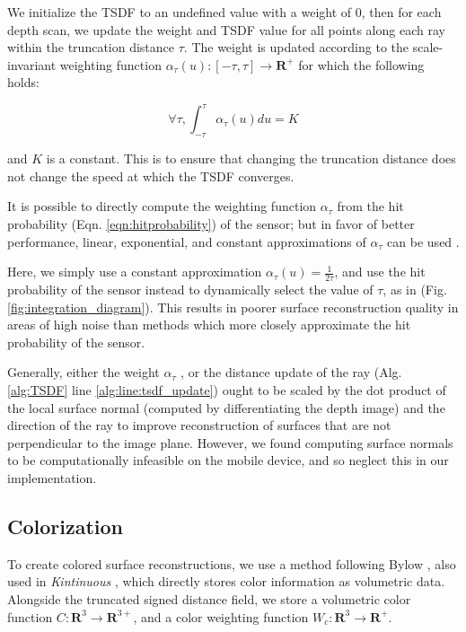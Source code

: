 \documentclass[10pt,twocolumn,letterpaper]{article}
\newcommand{\figref}[1]{Fig.\ref{#1}}
\begin{document}
We initialize the TSDF to an undefined value with a
weight of $0$, then for each depth scan, we update the weight and TSDF value
for all points along each ray within the truncation distance $\tau$. The weight
is updated according to the scale-invariant weighting function $\alpha_{\tau}(u) :
[-\tau,\tau]\to \mathbf{R^{+}} $ for which the following holds:

\begin{equation}
	\forall \tau, \int_{-\tau}^{\tau} \alpha_{\tau}(u) du = K 
\end{equation}
 
 \noindent and $K$ is a constant. This is to ensure that changing the truncation
 distance does not change the speed at which the TSDF converges.  

 It is possible \cite{Nguyen2012} to directly compute the weighting function
 $\alpha_{\tau}$ from the hit probability (Eqn. \ref{eqn:hitprobability}) of the
 sensor; but in favor of better performance, linear, exponential, and constant
 approximations of $\alpha_{\tau}$ can be used \cite{Curless1996, Newcombe,
 Whelan2013, Bylow2013}.

Here, we simply use a constant approximation $\alpha_{\tau}(u) = \frac{1}{2
\tau}$, and use the hit probability of the sensor instead to  dynamically select
the value of $\tau$, as in \cite{Nguyen2012} (\figref{fig:integration_diagram}).
This results in poorer surface reconstruction quality in areas of high noise
than methods which more closely approximate the hit probability of the sensor.

Generally, either the weight $\alpha_{\tau}$ \cite{Newcombe, Whelan2013}, or
the distance update of the ray (Alg. \ref{alg:TSDF} line
\ref{alg:line:tsdf_update}) \cite{Curless1996, Bylow2013} ought to be scaled by
the dot product of the local surface normal (computed by differentiating the
depth image) and the direction of the ray to improve reconstruction of surfaces
that are not perpendicular to the image plane. However, we found computing
surface normals to be computationally infeasible on the mobile device, and so
neglect this in our implementation.

\subsection{Colorization}
\label{section:color}
To create colored surface reconstructions, we use a method following Bylow
\etal \cite{Bylow2013}, also used in \textit{Kintinuous} \cite{Whelan2013},
which directly stores color information as volumetric data. Alongside the
truncated signed distance field, we store a volumetric color function
$C : \mathbf{R}^3 \to \mathbf{R}^{3+}$, and a color weighting function
$W_{c} :
\mathbf{R}^3 \to \mathbf{R^{+}}$.
\end{document}
